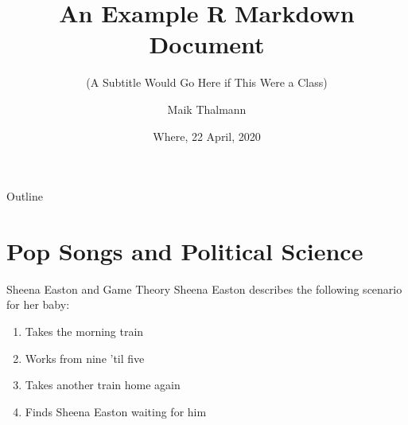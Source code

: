 \documentclass[10pt,ignorenonframetext,,aspectratio=149]{beamer}
\title{An Example R Markdown Document}
\subtitle{(A Subtitle Would Go Here if This Were a Class)}
\author{Maik Thalmann}
\date{Where, 22 April, 2020}
\institute{Georg-August-University Göttingen}
\providecommand{\tightlist}{%
  \setlength{\itemsep}{0pt}\setlength{\parskip}{0pt}}
\begin{document}
\frame{\titlepage}

\begin{frame}{Outline}
  \tableofcontents
\end{frame}

\hypertarget{pop-songs-and-political-science}{%
\section{Pop Songs and Political
Science}\label{pop-songs-and-political-science}}

\begin{frame}{Sheena Easton and Game Theory}
\protect\hypertarget{sheena-easton-and-game-theory}{}
Sheena Easton describes the following scenario for her baby:

\begin{enumerate}
\tightlist
\item
  Takes the morning train
\item
  Works from nine 'til five
\item
  Takes another train home again
\item
  Finds Sheena Easton waiting for him
\end{enumerate}
\end{frame}
\end{document}
